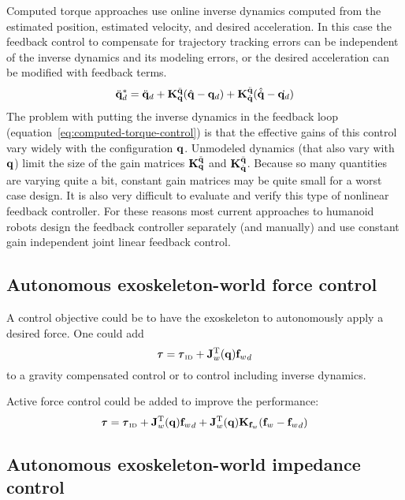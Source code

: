 \documentclass[letterpaper,12pt,fullpage]{article}
\newcommand{\invdyn}{{\mbox {\tiny ID}}}
\begin{document}
Computed torque approaches use online inverse dynamics computed from the estimated
position, estimated velocity, and desired acceleration.
In this case the feedback control to compensate for trajectory tracking errors can
be independent of the inverse dynamics and its modeling errors, or the desired
acceleration can be modified with feedback terms.
\begin{equation}
\ddot{{\bf q}}_d^* = \ddot{{\bf q}}_{d} + {\bf K}_{{\bf q}}^{\ddot{{\bf q}}} ( \hat{{\bf q}} - {\bf q}_d ) 
+ {\bf K}_{\dot{{\bf q}}}^{\ddot{{\bf q}}} ( \hat{\dot{{\bf q}}} - \dot{{\bf q}_d} )
\label{eq:computed-torque-control}
\end{equation}
The problem with putting the inverse dynamics in the feedback loop 
(equation~\ref{eq:computed-torque-control})
is that the
effective gains of this control vary widely with the configuration ${\bf q}$.
Unmodeled dynamics (that also vary with ${\bf q}$) limit the size of the gain matrices
${\bf K}_{{\bf q}}^{\ddot{{\bf q}}}$ and ${\bf K}_{\dot{{\bf q}}}^{\ddot{{\bf q}}}$. Because so many quantities
are varying quite a bit, constant gain matrices may be quite small for a worst case
design. It is also very difficult to evaluate and 
verify this type of nonlinear feedback controller.
For these reasons most current approaches to humanoid
robots design the feedback controller
separately (and manually) 
and use constant gain independent joint linear feedback control.

\subsection{Autonomous exoskeleton-world force control}

A control objective could be to have the exoskeleton to autonomously
apply a desired force.
One could add
\begin{equation}
\vtau = \vtau_{\invdyn} + \mJ_w^{\tr}(\vq) {\vf_w}_d
\end{equation}
to a gravity compensated control or to control including inverse dynamics.

Active force control could be added to improve the performance:
\begin{equation}
\vtau = \vtau_{\invdyn} + \mJ_w^{\tr}(\vq) {\vf_w}_d + \mJ_w^{\tr}(\vq) \mK_{\vf_w} (\vf_w - {\vf_w}_d)
\end{equation}

\subsection{Autonomous exoskeleton-world impedance control}
\end{document}
